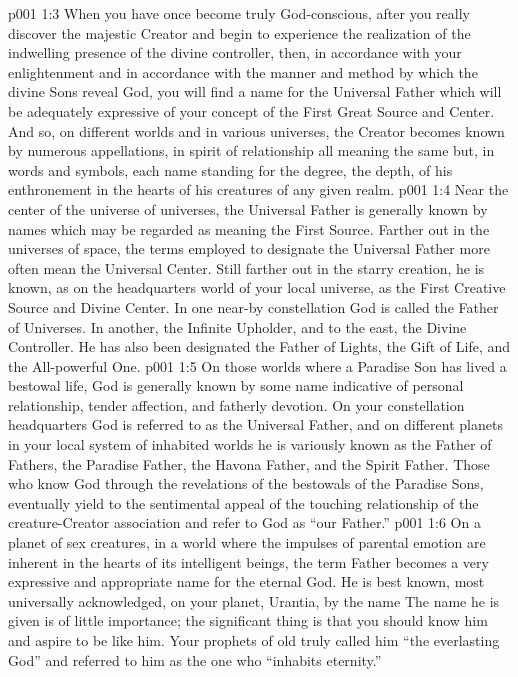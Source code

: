 \vs p001 1:3 When you have once become truly God\hyp{}conscious, after you really discover the majestic Creator and begin to experience the realization of the indwelling presence of the divine controller, then, in accordance with your enlightenment and in accordance with the manner and method by which the divine Sons reveal God, you will find a name for the Universal Father which will be adequately expressive of your concept of the First Great Source and Center. And so, on different worlds and in various universes, the Creator becomes known by numerous appellations, in spirit of relationship all meaning the same but, in words and symbols, each name standing for the degree, the depth, of his enthronement in the hearts of his creatures of any given realm.
\pc \vs p001 1:4 Near the center of the universe of universes, the Universal Father is generally known by names which may be regarded as meaning the First Source. Farther out in the universes of space, the terms employed to designate the Universal Father more often mean the Universal Center. Still farther out in the starry creation, he is known, as on the headquarters world of your local universe, as the First Creative Source and Divine Center. In one near\hyp{}by constellation God is called the Father of Universes. In another, the Infinite Upholder, and to the east, the Divine Controller. He has also been designated the Father of Lights, the Gift of Life, and the All\hyp{}powerful One.
\vs p001 1:5 On those worlds where a Paradise Son has lived a bestowal life, God is generally known by some name indicative of personal relationship, tender affection, and fatherly devotion. On your constellation headquarters God is referred to as the Universal Father, and on different planets in your local system of inhabited worlds he is variously known as the Father of Fathers, the Paradise Father, the Havona Father, and the Spirit Father. Those who know God through the revelations of the bestowals of the Paradise Sons, eventually yield to the sentimental appeal of the touching relationship of the creature\hyp{}Creator association and refer to God as “our Father.”
\vs p001 1:6 On a planet of sex creatures, in a world where the impulses of parental emotion are inherent in the hearts of its intelligent beings, the term Father becomes a very expressive and appropriate name for the eternal God. He is best known, most universally acknowledged, on your planet, Urantia, by the name  The name he is given is of little importance; the significant thing is that you should know him and aspire to be like him. Your prophets of old truly called him “the everlasting God” and referred to him as the one who “inhabits eternity.”
